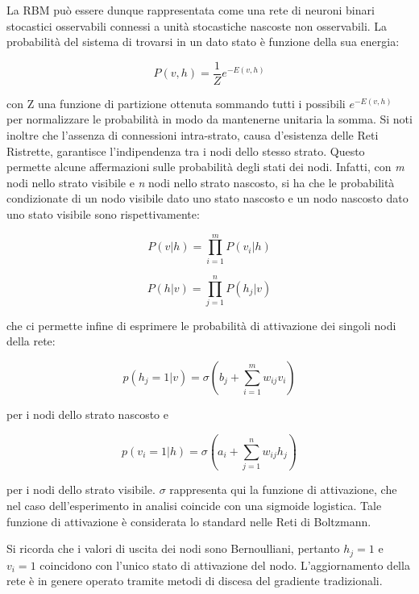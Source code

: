 \documentclass[10pt,letterpaper]{article}
\begin{document}
La RBM può essere dunque rappresentata come una rete di neuroni binari stocastici osservabili connessi a unità stocastiche nascoste non osservabili. La probabilità del sistema di trovarsi in un dato stato è funzione della sua energia:

\begin{equation}
P(v,h) = \frac{1}{Z} e^{-E(v,h)}
\end{equation}

con Z una funzione di partizione ottenuta sommando tutti i possibili $e^{-E(v,h)}$ per normalizzare le probabilità in modo da mantenerne unitaria la somma. Si noti inoltre che l'assenza di connessioni intra-strato, causa d'esistenza delle Reti Ristrette, garantisce l'indipendenza tra i nodi dello stesso strato. Questo permette alcune affermazioni sulle probabilità degli stati dei nodi. Infatti, con \textit{m} nodi nello strato visibile e \textit{n} nodi nello strato nascosto, si ha che le probabilità condizionate di un nodo visibile dato uno stato nascosto e un nodo nascosto dato uno stato visibile sono rispettivamente:

\begin{equation}
P(v|h) = \prod_{i=1}^{m}P(v_i|h)
\end{equation}

\begin{equation}
P(h|v) = \prod_{j=1}^{n}P(h_j|v)
\end{equation}

che ci permette infine di esprimere le probabilità di attivazione dei singoli nodi della rete:

\begin{equation}
p(h_j = 1|v) = \sigma(b_j + \sum_{i=1}^{m}w_{ij}v_i) 
\end{equation}

per i nodi dello strato nascosto e

\begin{equation}
p(v_i = 1|h) = \sigma(a_i + \sum_{j=1}^{n}w_{ij}h_j)
\end{equation}

per i nodi dello strato visibile. $\sigma$ rappresenta qui la funzione di attivazione, che nel caso dell'esperimento in analisi coincide con una sigmoide logistica. Tale funzione di attivazione è considerata lo standard nelle Reti di Boltzmann.

Si ricorda che i valori di uscita dei nodi sono Bernoulliani, pertanto $h_j = 1$ e $v_i = 1$ coincidono con l'unico stato di attivazione del nodo. L'aggiornamento della rete è in genere operato tramite metodi di discesa del gradiente tradizionali.
\end{document}

